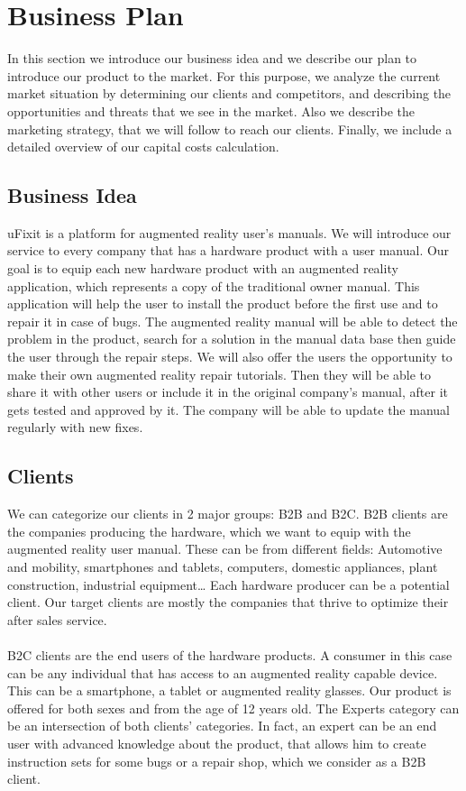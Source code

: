 \chapter{Business Plan}
	In this section we introduce our business idea and we describe our plan to introduce our product to the market. For this purpose, we analyze the current market situation by determining our clients and competitors, and describing the opportunities and threats that we see in the market. Also we describe the marketing strategy, that we will follow to reach our clients. Finally, we include a detailed overview of our capital costs calculation.

\section{Business Idea}
	uFixit is a platform for augmented reality user’s manuals. We will introduce our service to every company that has a hardware product with a user manual. Our goal is to equip each new hardware product with an augmented reality application, which represents a copy of the traditional owner manual. This application will help the user to install the product before the first use and to repair it in case of bugs. The augmented reality manual will be able to detect the problem in the product, search for a solution in the manual data base then guide the user through the repair steps. We will also offer the users the opportunity to make their own augmented reality repair tutorials. Then they will be able to share it with other users or include it in the original company’s manual, after it gets tested and approved by it. The company will be able to update the manual regularly with new fixes. 

\section{Clients}
	We can categorize our clients in 2 major groups: B2B and B2C. B2B clients are the companies producing the hardware, which we want to equip with the augmented reality user manual. These can be from different fields:  Automotive and mobility, smartphones and tablets, computers, domestic appliances, plant construction, industrial equipment… Each hardware producer can be a potential client. Our target clients are mostly the companies that thrive to optimize their after sales service. 
	\\
	\\
	B2C clients are the end users of the hardware products. A consumer in this case can be any individual that has access to an augmented reality capable device. This can be a smartphone, a tablet or augmented reality glasses. Our product is offered for both sexes and from the age of 12 years old. The Experts category can be an intersection of both clients’ categories. In fact, an expert can be an end user with advanced knowledge about the product, that allows him to create instruction sets for some bugs or a repair shop, which we consider as a B2B client.

